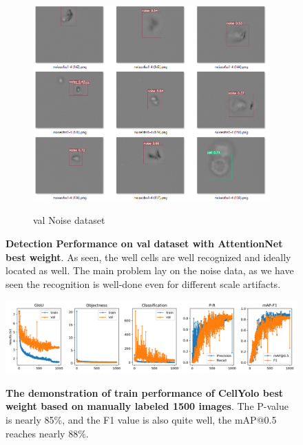 \begin{figure}[t]
\begin{center}
\begin{subfigure}[c]{0.6\textwidth}
			\includegraphics[width=\textwidth]{thesis-template-master/images/An illustration test performance of CellYolo best weight2.png}
			\label{fig:Out of Focus}
			\caption{val Noise dataset}
		\end{subfigure}
		
	\end{center}
	\caption{ \textbf{Detection Performance on val dataset with AttentionNet best weight}. As seen, the well cells are well recognized and ideally located as well. The main problem lay on the noise data, as we have seen the recognition is well-done even for different scale artifacts.}
	\label{fig:lennas}
\end{figure}

\begin{figure}[h]
\begin{center}
\includegraphics[width=\textwidth]{thesis-template-master/images/cellyolo best weight based on manually labeled 1500 images.png}
\label{fig:cellnet}
\end{center}
\caption{\textbf{The demonstration of train performance of CellYolo best weight based on manually labeled 1500 images}. The P-value is nearly 85\%, and the F1 value is also quite well, the mAP@0.5 reaches nearly 88\%.}
\end{figure}

